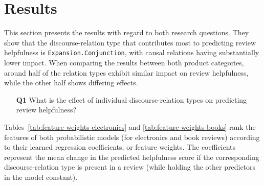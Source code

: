 \documentclass[
    a4paper,%
    12pt,%
    oneside,%
    toc=bibliography,
    final,
]{scrartcl}
\begin{document}
\section{Results}
\label{sec:results}

This section presents the results with regard to both research questions. They show that the discourse-relation type that contributes most to predicting review helpfulness is \lstinline|Expansion.Conjunction|, with causal relations having substantially lower impact. When comparing the results between both product categories, around half of the relation types exhibit similar impact on review helpfulness, while the other half shows differing effects.

\begin{enumerate}[rightmargin=1cm]
\item[\textbf{Q1}] What is the effect of individual discourse-relation types on predicting review helpfulness?
\end{enumerate}

Tables~\ref{tab:feature-weights-electronics} and \ref{tab:feature-weights-books} rank the features of both probabilistic models (for electronics and book reviews) according to their learned regression coefficients, or feature weights.
The coefficients represent the mean change in the predicted helpfulness score if the corresponding discourse-relation type is present in a review (while holding the other predictors in the model constant). 
\end{document}
